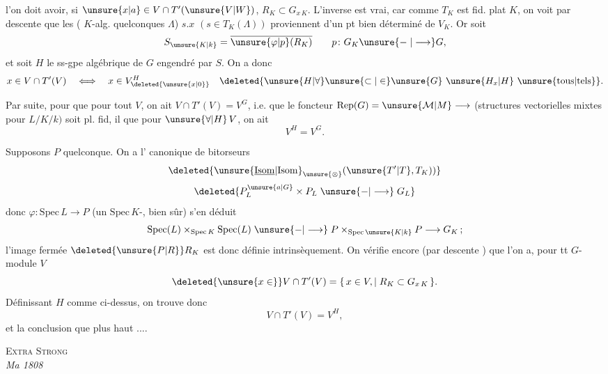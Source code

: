l'on doit avoir, si $\unsure{x|a}\in V\cap T'(\unsure{V|W})$, $R_K\subset G_{x\,K}$. L'inverse est vrai, car comme $T_K$ est fid. plat  $K$, on voit par descente que les  ( $K$-alg. quelconques $\Lambda$) $s.x$ $(s\in T_K(\Lambda))$ proviennent d'un pt bien déterminé de $V_K$. Or soit \deleted{\unsure{$\xi$}}
\[
S_{\unsure{K|k}}=\overline{\unsure{\varphi|p}(R_K)}\qquad p\colon G_K\unsure{\mathrel{-}|\longrightarrow}G,
\]
et soit $H$ le ss-gpe algébrique  de $G$ engendré par $S$. On a donc
\[
x\in V\cap T'(V)\quad\Longleftrightarrow\quad x\in V_{\deleted{\unsure{x|0}}}^{H}\quad \deleted{\unsure{H|\forall}\unsure{\subset|\in}\unsure{G}\ \unsure{H_x|H}\ \text{\unsure{tous|tels}}}.
\]

Par suite, pour que  pour tout $V$, on ait $V\cap T'(V)=V^G$, i.e. que le foncteur $\mathrm{Rep}(G)=\unsure{\mathcal M|M}\longrightarrow$ (structures vectorielles mixtes pour $L/K/k)$ soit pl. fid, il  que pour $\unsure{\forall|H}\,V$,  on ait
\[
V^H=V^G.
\]

Supposons $P$ quelconque. On a l' canonique de bitorseurs
\[
\deleted{\unsure{\underline{\mathrm{Isom}}|{\mathrm{Isom}}}_{\unsure{\otimes}}(\unsure{T'|T},T_K))}
\]
\[
\deleted{P_L^{\unsure{a|G}}\times P_L\mathrel{\unsure{-|\longrightarrow}}G_L}
\]
donc $\varphi\colon\mathrm{Spec}\,L\longrightarrow P$ (un $\mathrm{Spec}\,K$-, bien sûr) s'en déduit 
\[
\mathrm{Spec}(L)\times_{\mathrm{Spec}\,K}\mathrm{Spec}(L)\mathrel{\unsure{-|\longrightarrow}}
P\times_{\mathrm{Spec}\,\unsure{K|k}}P\longrightarrow G_K\,;
\]
l'image fermée $\deleted{\unsure{P|R}}R_K$ est donc définie intrinsèquement. On vérifie encore (par descente ) que  l'on a, pour tt $G$-module $V$
\[
\deleted{\unsure{x\in}}V\cap T'(V)=\{\,x\in V,\mid R_K\subset G_{x\,K}\,\}.
\]
Définissant $H$ comme ci-dessus, on trouve donc
\[
V\cap T'(V)=V^H,
\]
et la  conclusion que plus haut ....
{\centering \textsc{Extra Strong}\\
\textit{Ma 1808}\par}
